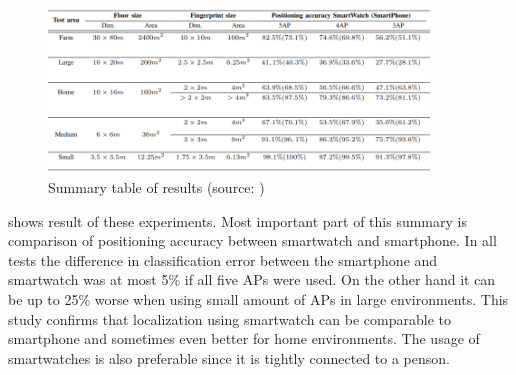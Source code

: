 \begin{figure}[H]
	\begin{centering}
		\includegraphics[width=0.9\textwidth]{img/smartwatch_vs_smartphone}
		\par\end{centering}
	\caption{Summary table of results (source: \cite{SWvsSP})\label{fig:SWvsSP}}
	\label{fig02c03}
\end{figure}

 shows result of these experiments. Most important part of this summary is comparison of positioning accuracy between smartwatch and smartphone. In all tests the difference in classification error between the smartphone and smartwatch was at most 5\% if all five APs were used. On the other hand it can be up to 25\% worse when using small amount of APs in large environments. This study confirms that localization using smartwatch can  be comparable to smartphone and sometimes even better for home environments. The usage of smartwatches is also preferable since it is tightly connected to a penson.
